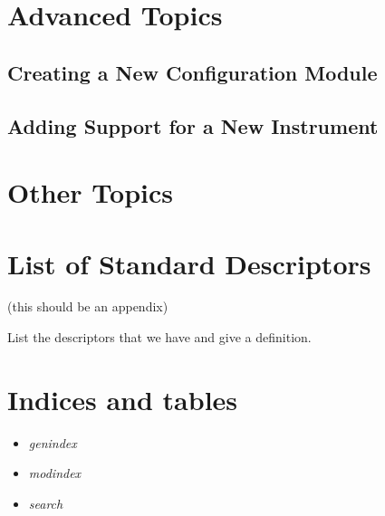 \documentclass[letterpaper,10pt,english]{sphinxmanual}
\begin{document}
\chapter{Advanced Topics}
\label{advanced:advanced-topics}\label{advanced::doc}

\section{Creating a New Configuration Module}
\label{advanced:creating-a-new-configuration-module}

\section{Adding Support for a New Instrument}
\label{advanced:adding-support-for-a-new-instrument}

\chapter{Other Topics}
\label{other:other-topics}\label{other::doc}

\chapter{List of Standard Descriptors}
\label{descriptors:list-of-standard-descriptors}\label{descriptors::doc}
(this should be an appendix)

List the descriptors that we have and give a definition.


\chapter{Indices and tables}
\label{index:indices-and-tables}\begin{itemize}
\item {} 
\emph{genindex}

\item {} 
\emph{modindex}

\item {} 
\emph{search}

\end{itemize}



\renewcommand{\indexname}{Index}
\printindex
\end{document}
